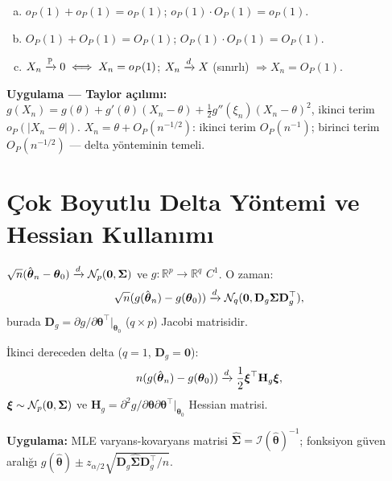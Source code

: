 \begin{teorem}\label{app:thm:op_algebra}
\begin{enumerate}[(a)]
  \item $o_P(1)+o_P(1)=o_P(1)$; $o_P(1)\cdot O_P(1)=o_P(1)$.
  \item $O_P(1)+O_P(1)=O_P(1)$; $O_P(1)\cdot O_P(1)=O_P(1)$.
  \item $X_n\xrightarrow{\mathbb{P}}0\iff X_n=o_P(1)$; $X_n\xrightarrow{d} X$ (sınırlı) $\Rightarrow X_n=O_P(1)$.
\end{enumerate}
\end{teorem}

\noindent\textbf{Uygulama --- Taylor açılımı:}
$g(X_n)=g(\theta)+g'(\theta)(X_n-\theta)+\frac12g''(\xi_n)(X_n-\theta)^2$, ikinci terim $o_P(|X_n-\theta|)$.
$X_n=\theta+O_P(n^{-1/2})$: ikinci terim $O_P(n^{-1})$; birinci terim $O_P(n^{-1/2})$ --- delta yönteminin temeli.

\section{Çok Boyutlu Delta Yöntemi ve Hessian Kullanımı}
\label{app:delta_cok}

\begin{teorem}\label{app:thm:delta_cok}
$\sqrt{n}(\hat{\boldsymbol\theta}_n-\boldsymbol\theta_0)\xrightarrow{d}\mathcal{N}_p(\mathbf{0},\boldsymbol\Sigma)$ ve $g:\mathbb{R}^p\to\mathbb{R}^q$ $C^1$. O zaman:
\[
  \sqrt{n}(g(\hat{\boldsymbol\theta}_n)-g(\boldsymbol\theta_0))\xrightarrow{d}\mathcal{N}_q(\mathbf{0},\mathbf{D}_g\boldsymbol\Sigma\mathbf{D}_g^\top),
\]
burada $\mathbf{D}_g=\partial g/\partial\boldsymbol\theta^\top\big|_{\boldsymbol\theta_0}$ ($q\times p$) Jacobi matrisidir.

İkinci dereceden delta ($q=1$, $\mathbf{D}_g=\mathbf{0}$):
\[
  n(g(\hat{\boldsymbol\theta}_n)-g(\boldsymbol\theta_0))\xrightarrow{d}\frac12\boldsymbol\xi^\top\mathbf{H}_g\boldsymbol\xi,
\]
$\boldsymbol\xi\sim\mathcal{N}_p(\mathbf{0},\boldsymbol\Sigma)$ ve $\mathbf{H}_g=\partial^2g/\partial\boldsymbol\theta\partial\boldsymbol\theta^\top|_{\boldsymbol\theta_0}$ Hessian matrisi.
\end{teorem}

\noindent\textbf{Uygulama:} MLE varyans-kovaryans matrisi $\hat{\boldsymbol\Sigma}=\mathcal{I}(\hat{\boldsymbol\theta})^{-1}$; fonksiyon güven aralığı $g(\hat{\boldsymbol\theta})\pm z_{\alpha/2}\sqrt{\mathbf{D}_g\hat{\boldsymbol\Sigma}\mathbf{D}_g^\top/n}$.
